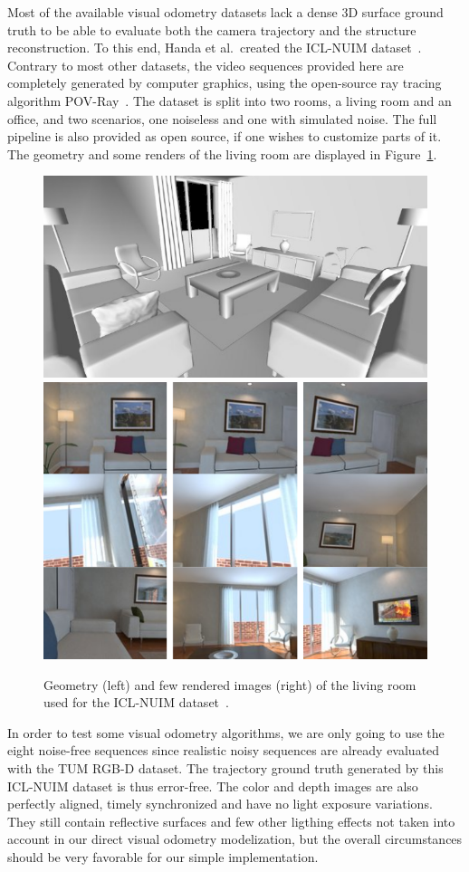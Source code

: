 Most of the available visual odometry datasets lack a dense 3D surface ground truth
to be able to evaluate both the camera trajectory and the structure reconstruction.
To this end, Handa et al.\ created the ICL-NUIM dataset~\cite{handa2014benchmark}.
Contrary to most other datasets, the video sequences provided here are completely
generated by computer graphics, using the open-source ray tracing algorithm
POV-Ray~\cite{povray}.
The dataset is split into two rooms, a living room and an office,
and two scenarios, one noiseless and one with simulated noise.
The full pipeline is also provided as open source,
if one wishes to customize parts of it.
The geometry and some renders of the living room are displayed in Figure~\ref{fig:icl-nuim}.

\begin{figure}[t]
	\centering
	\includegraphics[height=0.3\linewidth]{assets/img/icl-nuim-geometry.png}
	\hfill
	\includegraphics[height=0.3\linewidth]{assets/img/icl-nuim-povray.png}
	\caption{Geometry (left) and few rendered images (right)
	of the living room used for the ICL-NUIM dataset~\cite{handa2014benchmark}.}%
	\label{fig:icl-nuim}
\end{figure}

In order to test some visual odometry algorithms,
we are only going to use the eight noise-free sequences since realistic noisy sequences
are already evaluated with the TUM RGB-D dataset.
The trajectory ground truth generated by this ICL-NUIM dataset is thus error-free.
The color and depth images are also perfectly aligned,
timely synchronized and have no light exposure variations.
They still contain reflective surfaces and few other ligthing effects
not taken into account in our direct visual odometry modelization,
but the overall circumstances should be very favorable for our simple implementation.

